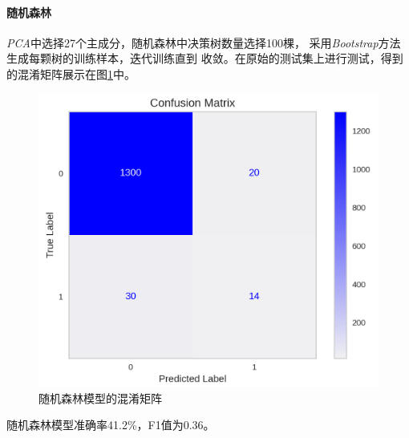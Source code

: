 \paragraph{随机森林}
\textit{PCA}中选择27个主成分，随机森林中决策树数量选择100棵，
采用\textit{Bootstrap}方法生成每颗树的训练样本，迭代训练直到
收敛。在原始的测试集上进行测试，得到的混淆矩阵展示在图\ref{fig:confusion-matrix-random-forest}中。
\begin{figure}[ht]
    \centering
    \includegraphics[width=.6\textwidth]{images/random_forest_confusion_matrix_unbalanced.png}
    \caption{随机森林模型的混淆矩阵}
    \label{fig:confusion-matrix-random-forest}
\end{figure}
随机森林模型准确率41.2\%，F1值为0.36。